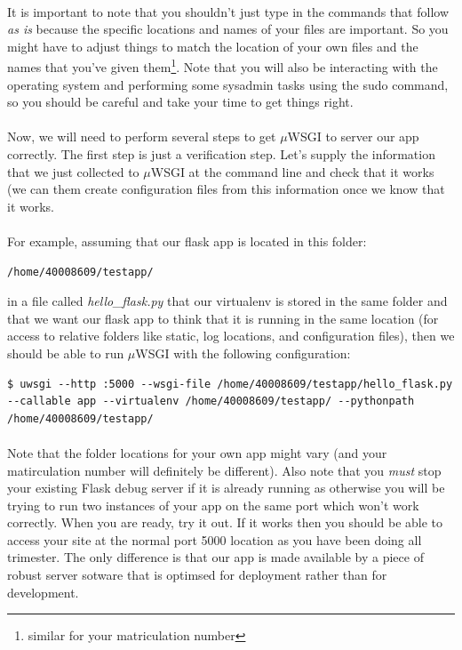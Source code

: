\documentclass[12pt, a4paper, oneside]{book}
\begin{document}
{\paragraph{} It is important to note that you shouldn't just type in the commands that follow \emph{as is} because the specific locations and names of your files are important. So you might have to adjust things to match the location of your own files and the names that you've given them\footnote{similar for your matriculation number}. Note that you will also be interacting with the operating system and performing some sysadmin tasks using the sudo command, so you should be careful and take your time to get things right.

\paragraph{} Now, we will need to perform several steps to get $\mu$WSGI to server our app correctly. The first step is just a verification step. Let's supply the information that we just collected to $\mu$WSGI at the command line and check that it works (we can them create configuration files from this information once we know that it works.

\paragraph{} For example, assuming that our flask app is located in this folder: 
\begin{lstlisting}
/home/40008609/testapp/ 
\end{lstlisting}
in a file called \emph{hello\_flask.py}  that our virtualenv is stored in the same folder and that we want our flask app to think that it is running in the same location (for access to relative folders like static, log locations, and configuration files), then we should be able to run $\mu$WSGI with the following configuration:

\begin{lstlisting}[style=DOS]
    $ uwsgi --http :5000 --wsgi-file /home/40008609/testapp/hello_flask.py --callable app --virtualenv /home/40008609/testapp/ --pythonpath /home/40008609/testapp/
\end{lstlisting}

\paragraph{} Note that the folder locations for your own app might vary (and your matirculation number will definitely be different). Also note that you \emph{must} stop your existing Flask debug server if it is already running as otherwise you will be trying to run two instances of your app on the same port which won't work correctly. When you are ready, try it out. If it works then you should be able to access your site at the normal port 5000 location as you have been doing all trimester. The only difference is that our app is made available by a piece of robust server sotware that is optimsed for deployment rather than for development.

}
\end{document}
